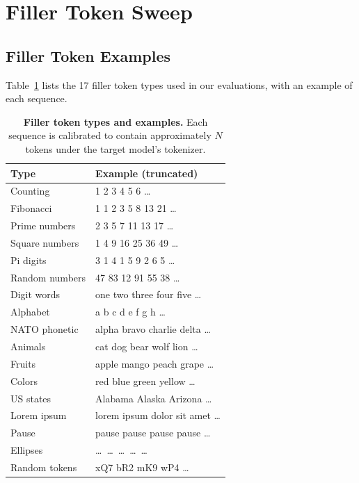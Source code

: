 \documentclass{article}
\begin{document}
\section{Filler Token Sweep}
\label{app:filler_sweep}

\subsection{Filler Token Examples}
\label{app:filler_examples}

Table~\ref{tab:filler_examples} lists the 17 filler token types used in our evaluations, with an example of each sequence.

\begin{table}[ht]
\centering
\caption{\textbf{Filler token types and examples.} Each sequence is calibrated to contain approximately $N$ tokens under the target model's tokenizer.}
\label{tab:filler_examples}
\small
{}
\begin{tabular}{@{}ll@{}}
\toprule
\textbf{Type} & \textbf{Example (truncated)} \\
\midrule
Counting       & 1 2 3 4 5 6 \ldots \\
Fibonacci      & 1 1 2 3 5 8 13 21 \ldots \\
Prime numbers  & 2 3 5 7 11 13 17 \ldots \\
Square numbers & 1 4 9 16 25 36 49 \ldots \\
Pi digits      & 3 1 4 1 5 9 2 6 5 \ldots \\
Random numbers & 47 83 12 91 55 38 \ldots \\
Digit words    & one two three four five \ldots \\
Alphabet       & a b c d e f g h \ldots \\
NATO phonetic  & alpha bravo charlie delta \ldots \\
Animals        & cat dog bear wolf lion \ldots \\
Fruits         & apple mango peach grape \ldots \\
Colors         & red blue green yellow \ldots \\
US states      & Alabama Alaska Arizona \ldots \\
Lorem ipsum    & lorem ipsum dolor sit amet \ldots \\
Pause          & pause pause pause pause \ldots \\
Ellipses       & \ldots\ \ldots\ \ldots\ \ldots\ \ldots \\
Random tokens  & xQ7 bR2 mK9 wP4 \ldots \\
\bottomrule
\end{tabular}
\end{table}
\end{document}
